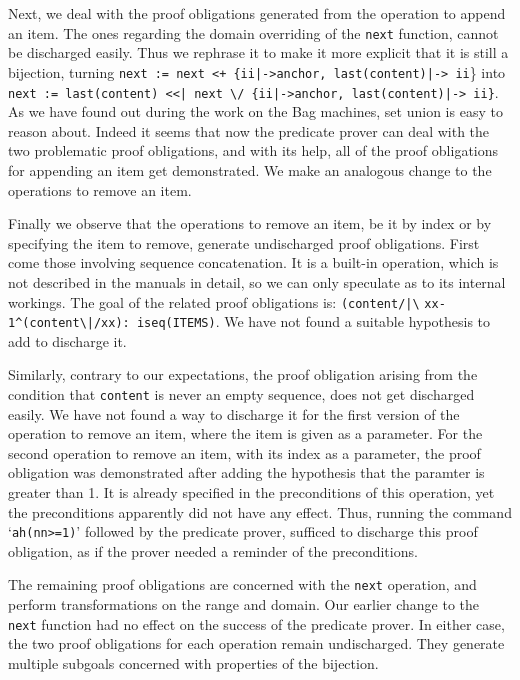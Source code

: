 \documentclass[12pt,journal,duplex]{IEEEtran}
\begin{document}
	Next, we deal with the proof obligations generated from the operation to append an item. The ones regarding the domain overriding of the \texttt{next} function, cannot be discharged easily. Thus we rephrase it to make it more explicit that it is still a bijection, turning \texttt{next := next <+ \{ii|->anchor, last(content)|-> ii}\} into \texttt{next := {last(content)} <<| next }\verb|\|\texttt{/ \{ii|->anchor, last(content)|-> ii\}}. As we have found out during the work on the Bag machines, set union is easy to reason about. Indeed it seems that now the predicate prover can deal with the two problematic proof obligations, and with its help, all of the proof obligations for appending an item get demonstrated. We make an analogous change to the operations to remove an item.

	Finally we observe that the operations to remove an item, be it by index or by specifying the item to remove, generate undischarged proof obligations. First come those involving sequence concatenation. It is a built-in operation, which is not described in the manuals in detail, so we can only speculate as to its internal workings. The goal of the related proof obligations is:
	\texttt{(content/|}\verb|\| \texttt{xx-1}\verb|^|\texttt{(content}\verb|\|\texttt{|/xx): iseq(ITEMS)}. We have not found a suitable hypothesis to add to discharge it.

	Similarly, contrary to our expectations, the proof obligation arising from the condition that \texttt{content} is never an empty sequence, does not get discharged easily. We have not found a way to discharge it for the first version of the operation to remove an item, where the item is given as a parameter. For the second operation to remove an item, with its index as a parameter, the proof obligation was demonstrated after adding the hypothesis that the paramter is greater than 1. It is already specified in the preconditions of this operation, yet the preconditions apparently did not have any effect. Thus, running the command `\texttt{ah(nn>=1)}' followed by the predicate prover, sufficed to discharge this proof obligation, as if the prover needed a reminder of the preconditions.

	The remaining proof obligations are concerned with the \texttt{next} operation, and perform transformations on the range and domain.  Our earlier change to the \texttt{next} function had no effect on the success of the predicate prover. In either case, the two proof obligations for each operation remain undischarged.  They generate multiple subgoals concerned with properties of the bijection.
\end{document}
